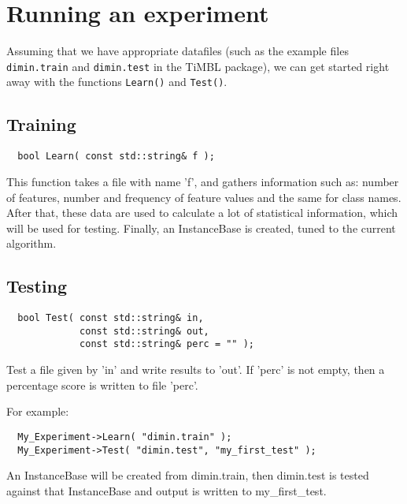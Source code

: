 \documentclass{report}
\begin{document}
\section{Running an experiment}

Assuming that we have appropriate datafiles (such as the example files {\tt
dimin.train} and {\tt dimin.test} in the TiMBL package), we can get
started right away with the functions {\tt Learn()} and {\tt Test()}.

\subsection{Training}
\begin{footnotesize}
\begin{verbatim}
  bool Learn( const std::string& f );
\end{verbatim}
\end{footnotesize}

This function takes a file with name 'f', and gathers information
such as: number of features, number and frequency of feature values and
the same for class names. After that, these data are used to calculate
a lot of statistical information, which will be used for
testing. Finally, an InstanceBase is created, tuned to the current
algorithm.

\subsection{Testing}
\begin{footnotesize}
\begin{verbatim}
  bool Test( const std::string& in,
             const std::string& out,
             const std::string& perc = "" );
\end{verbatim}
\end{footnotesize}

Test a file given by 'in' and write results to 'out'. If 'perc' is not
empty, then a percentage score is written to file 'perc'.

For example:

\begin{footnotesize}
\begin{verbatim}
  My_Experiment->Learn( "dimin.train" );  
  My_Experiment->Test( "dimin.test", "my_first_test" );  
\end{verbatim}
\end{footnotesize}

An InstanceBase will be created from dimin.train, then dimin.test is
tested against that InstanceBase and output is written to
my\_first\_test.
\end{document}
